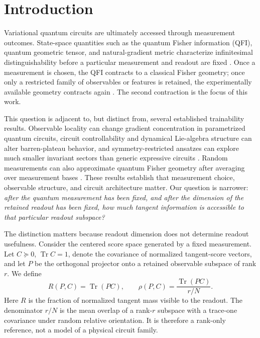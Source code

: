 \documentclass[aps,prx,reprint,superscriptaddress,nofootinbib,longbibliography]{revtex4-2}
\newcommand{\Tr}{\operatorname{Tr}}
\begin{document}
\section{Introduction}

Variational quantum circuits are ultimately accessed through measurement outcomes. State-space quantities such as the quantum Fisher information (QFI), quantum geometric tensor, and natural-gradient metric characterize infinitesimal distinguishability before a particular measurement and readout are fixed \cite{BraunsteinCaves1994,Stokes2020,Haug2021}. Once a measurement is chosen, the QFI contracts to a classical Fisher geometry; once only a restricted family of observables or features is retained, the experimentally available geometry contracts again \cite{BraunsteinCaves1994,HottaOzawa2004,LuLuoOh2012}. The second contraction is the focus of this work.

This question is adjacent to, but distinct from, several established trainability results. Observable locality can change gradient concentration in parametrized quantum circuits, circuit controllability and dynamical Lie-algebra structure can alter barren-plateau behavior, and symmetry-restricted ansatzes can explore much smaller invariant sectors than generic expressive circuits \cite{Cerezo2021,UvarovBiamonte2021,Larocca2022,HolmesSharma2022}. Random measurements can also approximate quantum Fisher geometry after averaging over measurement bases \cite{LuSha2025}. These results establish that measurement choice, observable structure, and circuit architecture matter. Our question is narrower: \emph{after the quantum measurement has been fixed, and after the dimension of the retained readout has been fixed, how much tangent information is accessible to that particular readout subspace?}

The distinction matters because readout dimension does not determine readout usefulness. Consider the centered score space generated by a fixed measurement. Let $C\succeq0$, $\Tr C=1$, denote the covariance of normalized tangent-score vectors, and let $P$ be the orthogonal projector onto a retained observable subspace of rank $r$. We define
\begin{equation}
R(P,C)=\Tr(PC),
\qquad
\rho(P,C)=\frac{\Tr(PC)}{r/N}.
\label{eq:def-rho}
\end{equation}
Here $R$ is the fraction of normalized tangent mass visible to the readout. The denominator $r/N$ is the mean overlap of a rank-$r$ subspace with a trace-one covariance under random relative orientation. It is therefore a rank-only reference, not a model of a physical circuit family.
\end{document}
